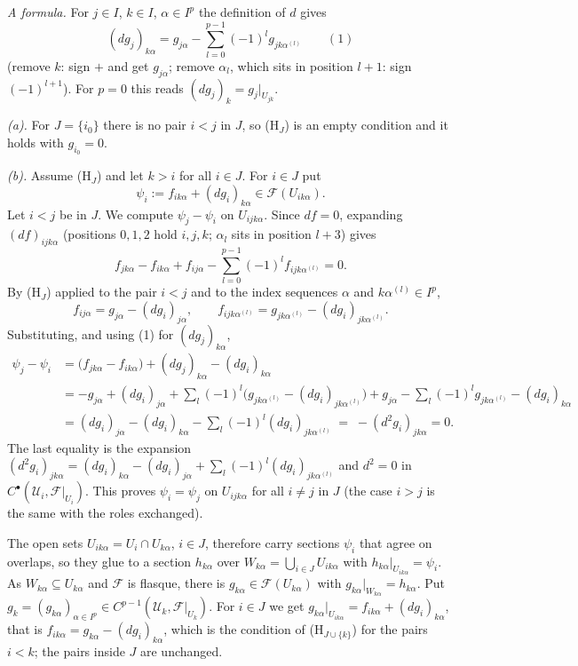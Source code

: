\documentclass[11pt]{article}
\begin{document}
\emph{A formula.} For $j\in I$, $k\in I$, $\alpha\in I^p$ the definition of $d$ gives
\[ (dg_j)_{k\alpha}=g_{j\alpha}-\sum_{l=0}^{p-1}(-1)^l g_{jk\alpha^{(l)}}\qquad(1) \]
(remove $k$: sign $+$ and get $g_{j\alpha}$; remove $\alpha_l$, which sits in position $l+1$: sign $(-1)^{l+1}$). For $p=0$ this reads $(dg_j)_k=g_j|_{U_{jk}}$.

\emph{(a).} For $J=\{i_0\}$ there is no pair $i<j$ in $J$, so (H$_J$) is an empty condition and it holds with $g_{i_0}=0$.

\emph{(b).} Assume (H$_J$) and let $k>i$ for all $i\in J$. For $i\in J$ put
\[ \psi_i:=f_{ik\alpha}+(dg_i)_{k\alpha}\in\mathcal F(U_{ik\alpha}). \]
Let $i<j$ be in $J$. We compute $\psi_j-\psi_i$ on $U_{ijk\alpha}$. Since $df=0$, expanding $(df)_{ijk\alpha}$ (positions $0,1,2$ hold $i,j,k$; $\alpha_l$ sits in position $l+3$) gives
\[ f_{jk\alpha}-f_{ik\alpha}+f_{ij\alpha}-\sum_{l=0}^{p-1}(-1)^l f_{ijk\alpha^{(l)}}=0. \]
By (H$_J$) applied to the pair $i<j$ and to the index sequences $\alpha$ and $k\alpha^{(l)}\in I^p$,
\[ f_{ij\alpha}=g_{j\alpha}-(dg_i)_{j\alpha},\qquad f_{ijk\alpha^{(l)}}=g_{jk\alpha^{(l)}}-(dg_i)_{jk\alpha^{(l)}}. \]
Substituting, and using (1) for $(dg_j)_{k\alpha}$,
\begin{align*}
\psi_j-\psi_i&=\bigl(f_{jk\alpha}-f_{ik\alpha}\bigr)+(dg_j)_{k\alpha}-(dg_i)_{k\alpha}\\
&=-g_{j\alpha}+(dg_i)_{j\alpha}+\sum_l(-1)^l\bigl(g_{jk\alpha^{(l)}}-(dg_i)_{jk\alpha^{(l)}}\bigr)+g_{j\alpha}-\sum_l(-1)^lg_{jk\alpha^{(l)}}-(dg_i)_{k\alpha}\\
&=(dg_i)_{j\alpha}-(dg_i)_{k\alpha}-\sum_l(-1)^l(dg_i)_{jk\alpha^{(l)}}\;=\;-(d^2g_i)_{jk\alpha}=0.
\end{align*}
The last equality is the expansion $(d^2g_i)_{jk\alpha}=(dg_i)_{k\alpha}-(dg_i)_{j\alpha}+\sum_l(-1)^l(dg_i)_{jk\alpha^{(l)}}$ and $d^2=0$ in $C^\bullet(\mathcal U_i,\mathcal F|_{U_i})$. This proves $\psi_i=\psi_j$ on $U_{ijk\alpha}$ for all $i\ne j$ in $J$ (the case $i>j$ is the same with the roles exchanged).

The open sets $U_{ik\alpha}=U_i\cap U_{k\alpha}$, $i\in J$, therefore carry sections $\psi_i$ that agree on overlaps, so they glue to a section $h_{k\alpha}$ over $W_{k\alpha}=\bigcup_{i\in J}U_{ik\alpha}$ with $h_{k\alpha}|_{U_{ik\alpha}}=\psi_i$. As $W_{k\alpha}\subseteq U_{k\alpha}$ and $\mathcal F$ is flasque, there is $g_{k\alpha}\in\mathcal F(U_{k\alpha})$ with $g_{k\alpha}|_{W_{k\alpha}}=h_{k\alpha}$. Put $g_k=(g_{k\alpha})_{\alpha\in I^p}\in C^{p-1}(\mathcal U_k,\mathcal F|_{U_k})$. For $i\in J$ we get $g_{k\alpha}|_{U_{ik\alpha}}=f_{ik\alpha}+(dg_i)_{k\alpha}$, that is $f_{ik\alpha}=g_{k\alpha}-(dg_i)_{k\alpha}$, which is the condition of (H$_{J\cup\{k\}}$) for the pairs $i<k$; the pairs inside $J$ are unchanged.
\end{document}

